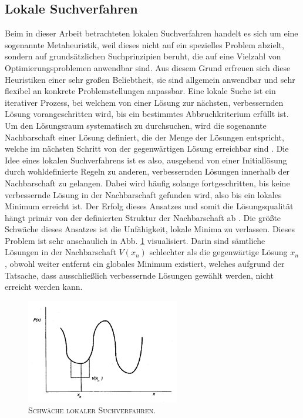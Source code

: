 \subsection{Lokale Suchverfahren}
\label{sec:local_search}

Beim in dieser Arbeit betrachteten lokalen Suchverfahren handelt es sich um eine sogenannte Metaheuristik,
weil dieses nicht auf ein spezielles Problem abzielt, sondern auf grundsätzlichen Suchprinzipien beruht,
die auf eine Vielzahl von Optimierungsproblemen anwendbar sind. Aus diesem Grund erfreuen sich diese Heuristiken einer sehr großen Beliebtheit, sie sind allgemein anwendbar und sehr flexibel an konkrete Problemstellungen anpassbar.
Eine lokale Suche ist ein iterativer Prozess, bei welchem von einer Lösung zur nächsten, verbessernden Lösung vorangeschritten wird, bis ein bestimmtes Abbruchkriterium erfüllt ist. Um den Lösungsraum systematisch zu durchsuchen, wird die
sogenannte Nachbarschaft einer Lösung definiert, die der Menge der Lösungen entspricht, welche im nächsten Schritt
von der gegenwärtigen Lösung erreichbar sind \cite{Brucker2006}.
Die Idee eines lokalen Suchverfahrens ist es also, ausgehend von einer Initiallösung durch wohldefinierte Regeln zu anderen,
verbessernden Lösungen innerhalb der Nachbarschaft zu gelangen. Dabei wird häufig solange fortgeschritten, bis keine verbessernde Lösung in der Nachbarschaft gefunden wird, also bis ein lokales Minimum erreicht ist.
Der Erfolg dieses Ansatzes und somit die Lösungsqualität hängt primär von der definierten Struktur
der Nachbarschaft ab \cite{Pirlot1996}.
Die größte Schwäche dieses Ansatzes ist die Unfähigkeit, lokale Minima zu verlassen. Dieses Problem ist sehr
anschaulich in Abb. \ref{fig:local_search_weakness} visualisiert. Darin sind sämtliche Lösungen in der
Nachbarschaft $V(x_n)$ schlechter als die gegenwärtige Lösung $x_n$, obwohl weiter entfernt ein globales Minimum
existiert, welches aufgrund der Tatsache, dass ausschließlich verbessernde Lösungen gewählt werden,
nicht erreicht werden kann.

\begin{figure}[H]
\centering
\includegraphics[width=0.6\textwidth]{img/local_minimum.png}
\caption{\textsc{Schwäche lokaler Suchverfahren. \cite{Pirlot1996}}}
\label{fig:local_search_weakness}
\end{figure}

